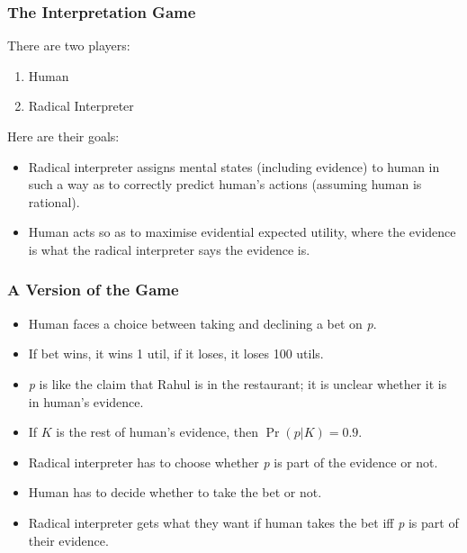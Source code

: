\begin{frame}

\frametitle{The Interpretation Game}
\label{theinterpretationgame}

There are two players:

\begin{enumerate}
\item Human

\item Radical Interpreter

\end{enumerate}

Here are their goals:

\begin{itemize}
\item Radical interpreter assigns mental states (including evidence) to human in such a way as to correctly predict human's actions (assuming human is rational).

\item Human acts so as to maximise evidential expected utility, where the evidence is what the radical interpreter says the evidence is.

\end{itemize}

\end{frame}

\begin{frame}

\frametitle{A Version of the Game}
\label{aversionofthegame}

\begin{itemize}
\item Human faces a choice between taking and declining a bet on \emph{p}.

\item If bet wins, it wins 1 util, if it loses, it loses 100 utils.

\item \emph{p} is like the claim that Rahul is in the restaurant; it is unclear whether it is in human's evidence.

\item If $K$ is the rest of human's evidence, then $\Pr(p | K) = 0.9$.

\item Radical interpreter has to choose whether \emph{p} is part of the evidence or not.

\item Human has to decide whether to take the bet or not.

\item Radical interpreter gets what they want if human takes the bet iff \emph{p} is part of their evidence.

\end{itemize}

\end{frame}

